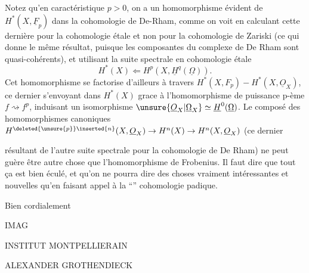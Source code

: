 Notez qu'en caractéristique $p>0$, on a un homomorphisme évident de $H^*(X,\underline F_p)$ dans la cohomologie de De-Rham, comme on voit en calculant cette dernière pour la cohomologie étale et non pour la cohomologie de Zariski (ce qui donne le même résultat, puisque les composantes du complexe de De Rham sont quasi-cohérents), et utilisant la suite spectrale en cohomologie étale
\[
H^*(X)\Longleftarrow H^p(X,\underline H^q(\underline\Omega)).
\]
Cet homomorphisme se factorise d'ailleurs à travers $H^*(X,F_p)-H^*(X,\underline O_X)$, ce dernier s'envoyant dans $H^*(X)$ grace à l'homomorphisme de puissance p-ème $f\rightsquigarrow f^p$, induisant un isomorphisme $\unsure{\underline O_X|\underline\Omega_X}\simeq\underline H^0(\underline\Omega)$. Le composé des homomorphismes canoniques $H^{\deleted{\unsure{p}}\inserted{n}}(X,\underline O_X)\to H^n(X)\to H^n(X,\underline O_X)$ (ce dernier


résultant de l'autre suite spectrale pour la cohomologie de De Rham) ne peut guère être autre chose que l'homomorphisme de Frobenius. Il faut dire que tout ça est bien éculé, et qu'on ne pourra dire  des choses vraiment intéressantes et nouvelles qu'en faisant appel à la ``'' cohomologie p\unsure{-}adique.

Bien cordialement


IMAG

INSTITUT MONTPELLIERAIN

ALEXANDER GROTHENDIECK



